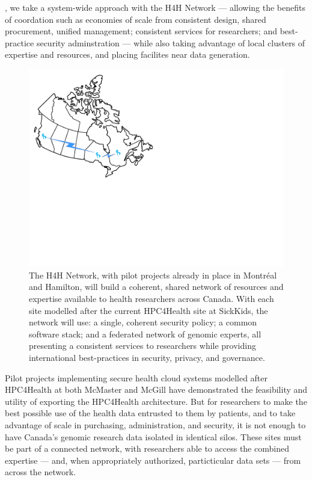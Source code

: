 \documentclass[twoside,symmetric,sfsidenotes,notoc]{tufte-book}
\begin{document}
,
we take a system-wide approach with the H4H Network --- allowing the benefits of coordation
such as economies of scale from consistent design, shared procurement, unified management;
consistent services for researchers; and best-practice security adminstration --- while also
taking advantage of local clusters of expertise and resources, and placing facilites near
data generation.

\begin{figure}
  \includegraphics{H4HNetwork_Canada.pdf}
  \caption[The H4H Network]{The H4H Network, with pilot projects already in place in Montr\'eal and
  Hamilton, will build a coherent, shared network of resources and expertise available to health 
  researchers across Canada.  With each site modelled after the current HPC4Health site at SickKids,
  the network will use: a single, coherent security policy; a common software stack; and a federated
  network of genomic experts, all presenting a consistent services to researchers while providing 
  international best-practices in security, privacy, and governance.}
  \label{fig:hpc4health_network}
\end{figure}

Pilot projects implementing secure health cloud systems modelled after HPC4Health at both McMaster
and McGill have demonstrated the feasibility and
utility of exporting the HPC4Health architecture.  But for researchers to make the best
possible use of the health data entrusted to them by patients, and to take advantage of scale
in purchasing, administration, and security, it is not enough to have Canada's genomic research
data isolated in identical silos.  These sites must be part of a connected network, with researchers able
to access the combined expertise --- and, when appropriately authorized, particticular 
data sets --- from across the network.
\end{document}
